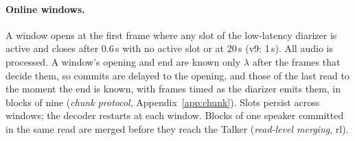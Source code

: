 \paragraph{Online windows.} A window opens at the first frame where any slot of the low-latency diarizer is active and
closes after 0.6\,s with no active slot or at 20\,s (v9: 1\,s). All audio is processed. A window's opening and end are
known only $\lambda$ after the frames that decide them, so commits are delayed to the opening, and those of the last read
to the moment the end is known, with frames timed as the diarizer emits them, in blocks of nine (\emph{chunk protocol},
Appendix~\ref{app:chunk}). Slots persist across windows; the decoder restarts at each window. Blocks of one speaker
committed in the same read are merged before they reach the Talker (\emph{read-level merging}, rl).
